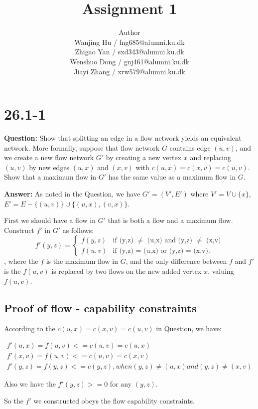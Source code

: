 \documentclass[12pt]{article}
\title{Assignment 1}
\author{Author \\
  Wanjing Hu / fng685@alumni.ku.dk  \\
  Zhigao Yan / sxd343@alumni.ku.dk  \\
  Wenshuo Dong / gnj461@alumni.ku.dk  \\
  Jiayi Zhang / xrw579@alumni.ku.dk \\
}
\begin{document}
\maketitle


\section{26.1-1}
\textbf{Question: }Show that splitting an edge in a flow network yields an equivalent network. More formally, suppose that flow network $G$ contains edge $(u, v)$, and we create a new flow network $G'$ by creating a new vertex $x$ and replacing $(u, v)$ by new edges $(u, x)$ and $(x, v)$ with $c(u, x) = c(x, v) = c(u, v)$. Show that a maximum flow in $G'$ has the same value as a maximum flow in $G$.

\textbf{Answer: }As noted in the Question, we have $G'=(V',E')$ where $V'=V\cup \{x\}$, $E'=E-\{(u,v)\}\cup\{(u,x), (v, x)\}$.

First we should have a flow in $G'$ that is both a flow and a maximum flow. Construct $f'$ in $G'$ as follows:
\begin{equation}
f'(y,z) = 
\begin{cases}
f(y,z) &\mbox{if (y,z) $\neq$ (u,x) and (y,z) $\neq$ (x,v)}\\
f(u,v) &\mbox{if (y,z) = (u,x) or (y,z) = (x,v)}.
\end{cases}
\end{equation}
, where the $f$ is the maximum flow in $G$, and the only difference between $f$ and $f'$ is the $f(u,v)$ is replaced by two flows on the new added vertex $x$, valuing $f(u,v)$.

\subsection{Proof of flow - capability constraints}

According to the $c(u, x) = c(x, v) = c(u, v)$ in Question, we have:

\begin{gather}
f'(u,x) = f(u,v) <= c(u,v) = c(u,x)\\ \nonumber
f'(x,v) = f(u,v)<=c(u,v) = c(x,v)\\ \nonumber
f'(y,z) = f(y,z) <= c(y,z), when (y,z) \neq (u,x) and (y,z) \neq (x,v) \nonumber
\end{gather}

Also we have the $f'(y,z)>= 0$ for any $(y,z)$.

So the $f'$ we constructed obeys the flow capability constraints.
\end{document}
